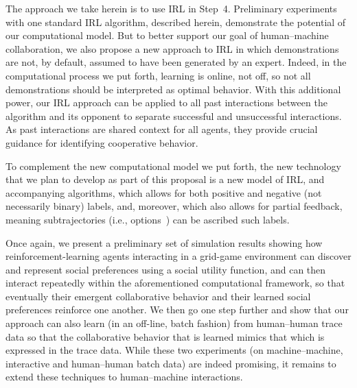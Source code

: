 The approach we take herein is to use IRL in Step~4.  Preliminary
experiments with one standard IRL algorithm, described herein,
demonstrate the potential of our computational model.
%
But to better support our goal of human--machine collaboration, we also
propose a new approach to IRL in which demonstrations are not, by
default, assumed to have been generated by an expert.  Indeed, in the
computational process we put forth, learning is online, not off, so
not all demonstrations should be interpreted as optimal behavior.
With this additional power, our IRL approach can be applied to all past
interactions between the algorithm and its opponent to separate successful
and unsuccessful interactions. As past interactions are shared context for
all agents, they provide crucial guidance for identifying cooperative
behavior.

To complement the new computational model we put forth, the new
technology that we plan to develop as part of this proposal is a new
model of IRL, and accompanying algorithms, which allows for both
positive and negative (not necessarily binary) labels, and, moreover,
which also allows for partial feedback, meaning subtrajectories (i.e.,
options~\cite{sutton99}) can be ascribed such
labels.


Once again,
we present a preliminary set of simulation results showing how
reinforcement-learning agents interacting in a grid-game environment
can discover and represent social preferences using a social utility function, and
can then interact repeatedly within the aforementioned computational
framework, so that eventually their emergent collaborative behavior
and their learned social preferences reinforce one another.  We then
go one step further and show that our approach can also learn (in an
off-line, batch fashion) from human--human trace data so that the
collaborative behavior that is learned mimics that which is expressed
in the trace data.  While these two experiments (on machine--machine,
interactive and human--human batch data) are indeed promising, it
remains to extend these techniques to human--machine interactions.

